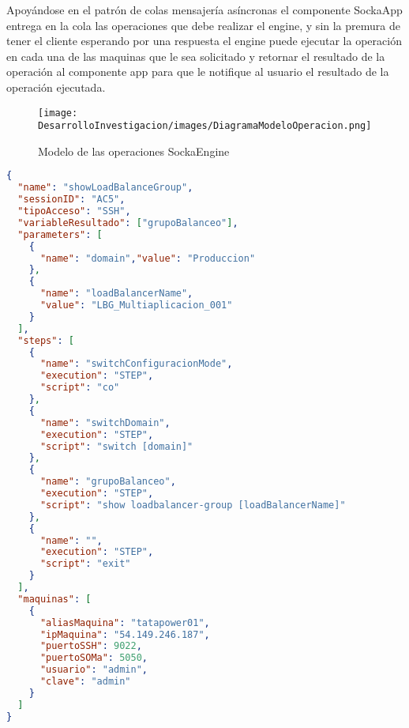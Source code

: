 Apoyándose en el patrón de colas mensajería asíncronas el componente SockaApp entrega en la cola las operaciones que debe realizar el engine, y sin la premura de tener el cliente esperando por una respuesta el engine puede ejecutar la operación en cada una de las maquinas que le sea solicitado y retornar el resultado de la operación al componente app para que le notifique al usuario el resultado de la operación ejecutada.

\begin{figure}[th!]
    \centering
    \texttt{[image: DesarrolloInvestigacion/images/DiagramaModeloOperacion.png]}
    \caption{Modelo de las operaciones SockaEngine}
\end{figure}

\begin{lstlisting}[here,language=json,firstnumber=1,caption={Ejemplo mensaje enviado al engine para mostrar la informacion de un grupo de balanceo}]
{
  "name": "showLoadBalanceGroup",
  "sessionID": "AC5",
  "tipoAcceso": "SSH",
  "variableResultado": ["grupoBalanceo"],
  "parameters": [
    {
      "name": "domain","value": "Produccion"
    },
    {
      "name": "loadBalancerName", 
      "value": "LBG_Multiaplicacion_001"
    }
  ],
  "steps": [
    {
      "name": "switchConfiguracionMode",
      "execution": "STEP",
      "script": "co"
    },
    {
      "name": "switchDomain",
      "execution": "STEP",
      "script": "switch [domain]"
    },
    {
      "name": "grupoBalanceo",
      "execution": "STEP",
      "script": "show loadbalancer-group [loadBalancerName]"
    },
    {
      "name": "",
      "execution": "STEP",
      "script": "exit"
    }
  ],
  "maquinas": [
    {
      "aliasMaquina": "tatapower01",
      "ipMaquina": "54.149.246.187",
      "puertoSSH": 9022,
      "puertoSOMa": 5050,
      "usuario": "admin",
      "clave": "admin"
    }
  ]
}
\end{lstlisting}





